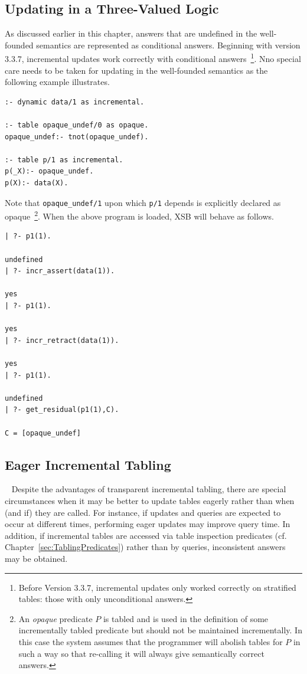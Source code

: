 \subsection{Updating in a Three-Valued Logic}
%
As discussed earlier in this chapter, answers that are undefined in
the well-founded semantics are represented as conditional answers.
Beginning with version 3.3.7, incremental updates work correctly with
conditional answers~\footnote{Before Version 3.3.7, incremental
  updates only worked correctly on stratified tables: those with only
  unconditional answers.}.  Nno special care needs to be taken for
updating in the well-founded semantics as the following example
illustrates.

\begin{verbatim}
:- dynamic data/1 as incremental.

:- table opaque_undef/0 as opaque.
opaque_undef:- tnot(opaque_undef).

:- table p/1 as incremental.
p(_X):- opaque_undef.
p(X):- data(X).
\end{verbatim}
%
Note that {\tt opaque\_undef/1} upon which {\tt p/1} depends is
explicitly declared as opaque~\footnote{An {\em opaque} predicate $P$
  is tabled and is used in the definition of some incrementally tabled
  predicate but should not be maintained incrementally.  In this case
  the system assumes that the programmer will abolish tables for $P$
  in such a way so that re-calling it will always give semantically
  correct answers.}.  When the above program is loaded, XSB will
behave as follows.
%
{\small
\begin{verbatim}
| ?- p1(1).

undefined
| ?- incr_assert(data(1)).

yes
| ?- p1(1).

yes
| ?- incr_retract(data(1)).

yes
| ?- p1(1).

undefined
| ?- get_residual(p1(1),C).

C = [opaque_undef]
\end{verbatim}
}
%

\subsection{Eager Incremental Tabling}~\label{sec:incr-eager}
%
Despite the advantages of transparent incremental tabling, there are
special circumstances when it may be better to update tables eagerly
rather than when (and if) they are called.  For instance, if updates
and queries are expected to occur at different times, performing eager
updates may improve query time.  In addition, if incremental tables
are accessed via table inspection predicates
(cf. Chapter~\ref{sec:TablingPredicates}) rather than by queries,
inconsistent answers may be obtained.  

